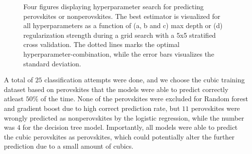 \clearpage
\begin{figure}[!tbp]
  \begin{subfigure}[b]{1.0\textwidth}
    \centering
    
  \end{subfigure}
  \par\bigskip
  \begin{subfigure}[b]{0.5\textwidth}
    
    \caption{}
    \label{fig:per-LOG}
  \end{subfigure}%
  \hfill
  \begin{subfigure}[b]{0.5\textwidth}
    
    \caption{}
    \label{fig:per-DT}
  \end{subfigure}

  \begin{subfigure}[b]{0.5\textwidth}
    
    \caption{}
    \label{fig:per-RF}
  \end{subfigure}%
  \hfill
  \begin{subfigure}[b]{0.5\textwidth}
    
    \caption{}
    \label{fig:per-GB}
  \end{subfigure}
  \vspace*{-130mm}
  \caption{{Four figures displaying hyperparameter search for predicting perovskites or nonperovskites. The best estimator is visualized for all hyperparameters as a function of (a, b and c) max depth or (d) regularization strength during a grid search with a 5x5 stratified cross validation. The dotted lines marks the optimal hyperparameter-combination, while the error bars visualizes the standard deviation. }}
  \label{fig:perovskite-params}
\end{figure}

A total of $25$ classification attempts were done, and we choose the cubic training dataset based on perovskites that the models were able to predict correctly atleast $50\%$ of the time. None of the perovskites were excluded for Random forest and gradient boost due to high correct prediction rate, but $11$ perovskites were wrongly predicted as nonperovskites by the logistic regression, while the number was $4$ for the decision tree model. Importantly, all models were able to predict the cubic perovskites as perovskites, which could potentially alter the further prediction due to a small amount of cubics.

